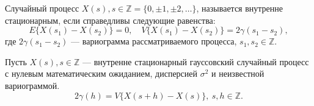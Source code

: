 Случайный процесс $ X(s), s \in \mathbb{Z} = \{0, \pm 1, \pm 2, \dots \} $, называется внутренне стационарным, если справедливы следующие равенства:
\begin{equation*}
	E \{ X(s_1) - X(s_2) \} = 0, \quad V \{ X(s_1) - X(s_2) \} = 2 \gamma(s_1 - s_2),
\end{equation*}
где $2 \gamma(s_1 - s_2)$ --- вариограмма рассматриваемого процесса, $s_1,s_2 \in \mathbb{Z}$.

Пусть $ X(s), s \in \mathbb{Z} $ --- внутренне стационарный гауссовский случайный процесс с нулевым математическим ожиданием, дисперсией $ \sigma^2 $ и неизвестной вариограммой.
\begin{equation*}
	2 \gamma(h) = V \{ X(s+h) - X(s) \}, ~ s,h \in \mathbb{Z}.
\end{equation*}